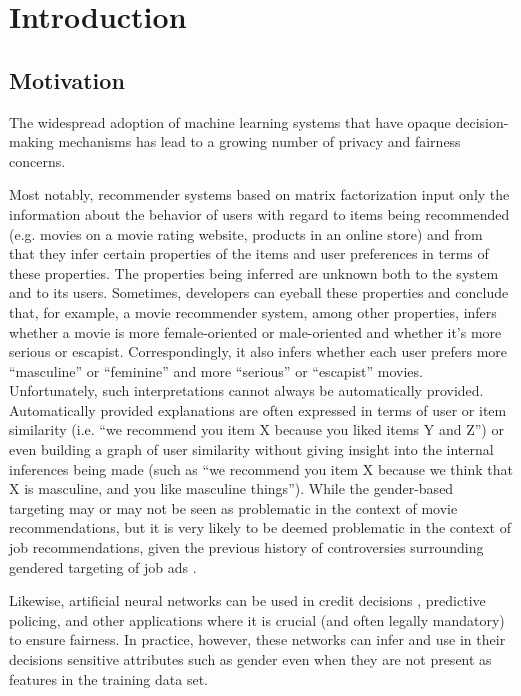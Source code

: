 \chapter{Introduction}

\section{Motivation}

The widespread adoption of machine learning systems that have opaque
decision-making mechanisms has lead to a growing number of privacy and fairness
concerns.

Most notably, recommender systems based on matrix factorization
input only the information about the behavior of users with regard to items
being recommended (e.g. movies on a movie rating website, products in an
online store) and from that they infer certain properties of the items and
user preferences in terms of these properties\cite{facebook-cf}. The properties
being inferred are unknown both to the system and to its users. Sometimes,
developers can eyeball these properties and conclude that, for example, a movie
recommender system, among other properties, infers whether a movie is more
female-oriented or male-oriented and whether it's more serious or escapist.
Correspondingly, it also infers whether each user prefers more ``masculine'' or
``feminine'' and more ``serious'' or ``escapist'' movies\cite{koren2009matrix}.
Unfortunately, such interpretations cannot always be automatically provided.
Automatically provided explanations are often expressed in terms of user or
item similarity (i.e. ``we recommend you item X because you liked items Y and
Z'') or even building a graph of user similarity\cite{hernando2013trees}
without giving insight into the internal inferences being made (such as
``we recommend you item X because we think that X is masculine, and you like
masculine things''). While the gender-based targeting may or may not be seen as
problematic in the context of movie recommendations, but it is very likely to be
deemed problematic in the context of job recommendations, given the previous
history of controversies surrounding gendered targeting of job ads
\cite{datta_tschantz_datta_2015}.

Likewise, artificial neural networks can be used in credit decisions
\cite{WEST20001131}, predictive policing\cite{Seo2018PartiallyGN}, and other
applications where it is crucial (and often legally mandatory) to ensure
fairness. In practice, however, these networks can infer and use in their
decisions sensitive attributes such as gender even when they are not present
as features in the training data set\cite{Beutel2017DataDA}.

